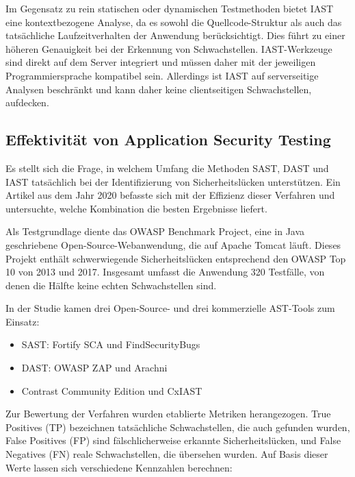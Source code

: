 \documentclass[acmtog]{acmart}
\begin{document}
Im Gegensatz zu rein statischen oder dynamischen Testmethoden bietet IAST eine kontextbezogene Analyse, da es sowohl die Quellcode-Struktur als auch das tatsächliche Laufzeitverhalten der Anwendung berücksichtigt. 
Dies führt zu einer höheren Genauigkeit bei der Erkennung von Schwachstellen.
IAST-Werkzeuge sind direkt auf dem Server integriert und müssen daher mit der jeweiligen Programmiersprache kompatibel sein.
Allerdings ist IAST auf serverseitige Analysen beschränkt und kann daher keine clientseitigen Schwachstellen, aufdecken. \cite{pan_interactive_2019}


\subsection{Effektivität von Application Security Testing}
Es stellt sich die Frage, in welchem Umfang die Methoden SAST, DAST und IAST tatsächlich bei der Identifizierung von Sicherheitslücken unterstützen.
Ein Artikel aus dem Jahr 2020 befasste sich mit der Effizienz dieser Verfahren und untersuchte, welche Kombination die besten Ergebnisse liefert. \cite{mateo_tudela_combining_2020}

Als Testgrundlage diente das OWASP Benchmark Project, eine in Java geschriebene Open-Source-Webanwendung, die auf Apache Tomcat läuft.
Dieses Projekt enthält schwerwiegende Sicherheitslücken entsprechend den OWASP Top 10 von 2013 und 2017.
Insgesamt umfasst die Anwendung 320 Testfälle, von denen die Hälfte keine echten Schwachstellen sind. \cite{mateo_tudela_combining_2020}

In der Studie kamen drei Open-Source- und drei kommerzielle AST-Tools zum Einsatz: \cite{mateo_tudela_combining_2020}

\begin{itemize}
	\item SAST: Fortify SCA und FindSecurityBugs
	\item DAST: OWASP ZAP und Arachni
	\item Contrast Community Edition und CxIAST
\end{itemize}


Zur Bewertung der Verfahren wurden etablierte Metriken herangezogen. 
True Positives (TP) bezeichnen tatsächliche Schwachstellen, die auch gefunden wurden, False Positives (FP) sind fälschlicherweise erkannte Sicherheitslücken, und False Negatives (FN) reale Schwachstellen, die übersehen wurden. 
Auf Basis dieser Werte lassen sich verschiedene Kennzahlen berechnen:
\cite{mateo_tudela_combining_2020}
\end{document}
